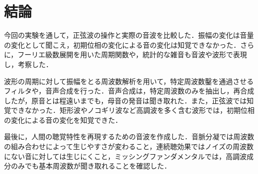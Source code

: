 \chapter{結論}
今回の実験を通して，正弦波の操作と実際の音波を比較した．振幅の変化は音量の変化として聞こえ，初期位相の変化による音の変化は知覚できなかった．さらに，フーリエ級数展開を用いた周期関数や，統計的な雑音も音波や波形で表現し，考察した．\par
波形の周期に対して振幅をとる周波数解析を用いて，特定周波数鑿を通過させるフィルタや，音声合成を行った．音声合成は，特定周波数のみを抽出し，再合成したが，原音とは程遠いまでも，母音の発音は聞き取れた．また，正弦波では知覚できなかった．矩形波やノコギリ波など高調波を多く含む波形では，初期位相の変化による音の変化を知覚できた．\par
最後に，人間の聴覚特性を再現するための音波を作成した．音脈分凝では周波数の組み合わせによって生じやすさが変わること，連続聴効果ではノイズの周波数にない音に対しては生じにくこと，ミッシングファンダメンタルでは，高調波成分のみでも基本周波数が聞き取れることを確認した．